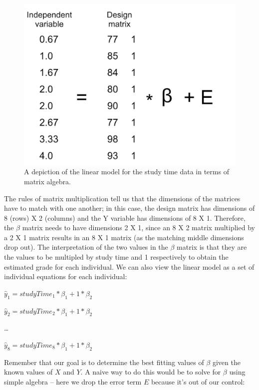 \documentclass[
  12pt,
]{book}
\begin{document}
\begin{figure}
\includegraphics[width=16.67in]{images/glm_matrix} \caption{A depiction of the linear model for the study time data in terms of matrix algebra.}\label{fig:GLMmatrix}
\end{figure}

The rules of matrix multiplication tell us that the dimensions of the matrices have to match with one another; in this case, the design matrix has dimensions of 8 (rows) X 2 (columns) and the Y variable has dimensions of 8 X 1. Therefore, the \(\beta\) matrix needs to have dimensions 2 X 1, since an 8 X 2 matrix multiplied by a 2 X 1 matrix results in an 8 X 1 matrix (as the matching middle dimensions drop out). The interpretation of the two values in the \(\beta\) matrix is that they are the values to be multipled by study time and 1 respectively to obtain the estimated grade for each individual. We can also view the linear model as a set of individual equations for each individual:

\(\hat{y}_1 = studyTime_1*\beta_1 + 1*\beta_2\)

\(\hat{y}_2 = studyTime_2*\beta_1 + 1*\beta_2\)

\ldots{}

\(\hat{y}_8 = studyTime_8*\beta_1 + 1*\beta_2\)

Remember that our goal is to determine the best fitting values of \(\beta\) given the known values of \(X\) and \(Y\). A naive way to do this would be to solve for \(\beta\) using simple algebra -- here we drop the error term \(E\) because it's out of our control:
\end{document}
